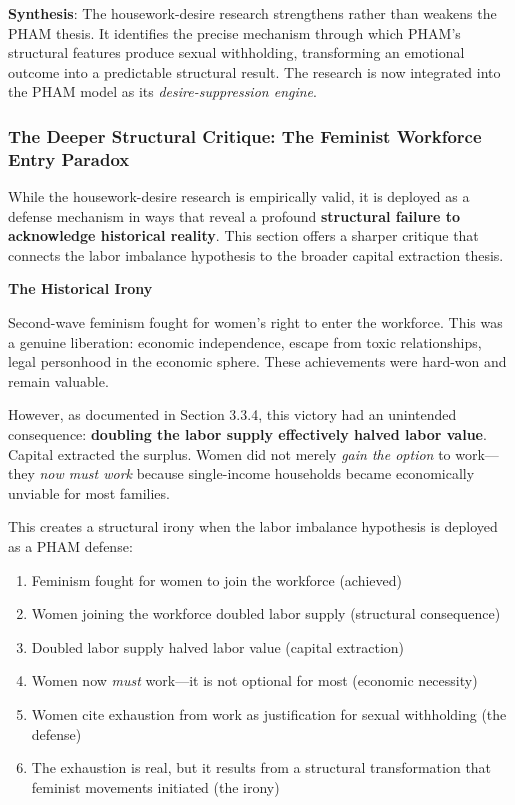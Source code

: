 \documentclass[12pt, letterpaper]{article}
\begin{document}
\textbf{Synthesis}: The housework-desire research strengthens rather than weakens the PHAM thesis. It identifies the precise mechanism through which PHAM's structural features produce sexual withholding, transforming an emotional outcome into a predictable structural result. The research is now integrated into the PHAM model as its \textit{desire-suppression engine}.

\subsubsection{The Deeper Structural Critique: The Feminist Workforce Entry Paradox}

While the housework-desire research is empirically valid, it is deployed as a defense mechanism in ways that reveal a profound \textbf{structural failure to acknowledge historical reality}. This section offers a sharper critique that connects the labor imbalance hypothesis to the broader capital extraction thesis.

\textbf{The Historical Irony}

Second-wave feminism fought for women's right to enter the workforce. This was a genuine liberation: economic independence, escape from toxic relationships, legal personhood in the economic sphere. These achievements were hard-won and remain valuable.

However, as documented in Section 3.3.4, this victory had an unintended consequence: \textbf{doubling the labor supply effectively halved labor value}. Capital extracted the surplus. Women did not merely \textit{gain the option} to work---they \textit{now must work} because single-income households became economically unviable for most families.

This creates a structural irony when the labor imbalance hypothesis is deployed as a PHAM defense:

\begin{enumerate}
    \item Feminism fought for women to join the workforce (achieved)
    \item Women joining the workforce doubled labor supply (structural consequence)
    \item Doubled labor supply halved labor value (capital extraction)
    \item Women now \textit{must} work---it is not optional for most (economic necessity)
    \item Women cite exhaustion from work as justification for sexual withholding (the defense)
    \item The exhaustion is real, but it results from a structural transformation that feminist movements initiated (the irony)
\end{enumerate}
\end{document}
